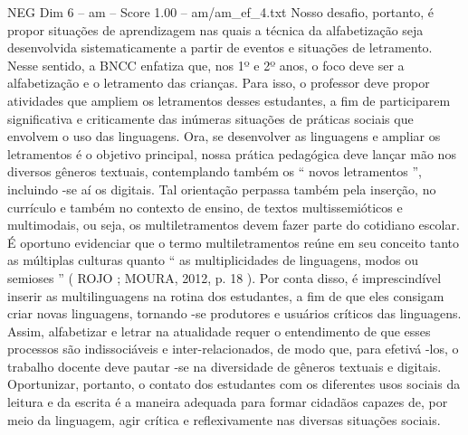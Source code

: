 \begin{textsample}{NEG Dim 6 – am – Score 1.00 – am/am\_ef\_4.txt}
Nosso desafio, portanto, é propor situações de aprendizagem nas quais a técnica da alfabetização seja desenvolvida sistematicamente a partir de eventos e situações de letramento.
Nesse sentido, a BNCC enfatiza que, nos 1º e 2º anos, o foco deve ser a alfabetização e o letramento das crianças.
Para isso, o professor deve propor atividades que ampliem os letramentos desses estudantes, a fim de participarem significativa e criticamente das inúmeras situações de práticas sociais que envolvem o uso das linguagens.
Ora, se desenvolver as linguagens e ampliar os letramentos é o objetivo principal, nossa prática pedagógica deve lançar mão nos diversos gêneros textuais, contemplando também os “ novos letramentos ”, incluindo -se aí os digitais.
Tal orientação perpassa também pela inserção, no currículo e também no contexto de ensino, de textos multissemióticos e multimodais, ou seja, os multiletramentos devem fazer parte do cotidiano escolar.
É oportuno evidenciar que o termo multiletramentos reúne em seu conceito tanto as múltiplas culturas quanto “ as multiplicidades de linguagens, modos ou semioses ” ( ROJO ; MOURA, 2012, p. 18 ).
Por conta disso, é imprescindível inserir as multilinguagens na rotina dos estudantes, a fim de que eles consigam criar novas linguagens, tornando -se produtores e usuários críticos das linguagens.
Assim, alfabetizar e letrar na atualidade requer o entendimento de que esses processos são indissociáveis e inter-relacionados, de modo que, para efetivá -los, o trabalho docente deve pautar -se na diversidade de gêneros textuais e digitais.
Oportunizar, portanto, o contato dos estudantes com os diferentes usos sociais da leitura e da escrita é a maneira adequada para formar cidadãos capazes de, por meio da linguagem, agir crítica e reflexivamente nas diversas situações sociais.

\end{textsample}
